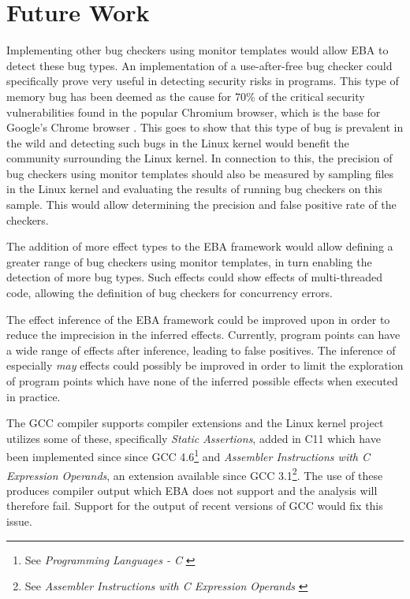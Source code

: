 \section{Future Work}

Implementing other bug checkers using monitor templates would allow EBA to detect these bug types. An implementation of a use-after-free bug checker could specifically prove very useful in detecting security risks in programs. This type of memory bug has been deemed as the cause for 70\% of the critical security vulnerabilities found in the popular Chromium browser, which is the base for Google's Chrome browser \cite{google-use-after-free}. This goes to show that this type of bug is prevalent in the wild and detecting such bugs in the Linux kernel would benefit the community surrounding the Linux kernel. In connection to this, the precision of bug checkers using monitor templates should also be measured by sampling files in the Linux kernel and evaluating the results of running bug checkers on this sample. This would allow determining the precision and false positive rate of the checkers.  

\newpar The addition of more effect types to the EBA framework would allow defining a greater range of bug checkers using monitor templates, in turn enabling the detection of more bug types. Such effects could show effects of multi-threaded code, allowing the definition of bug checkers for concurrency errors. 

\newpar The effect inference of the EBA framework could be improved upon in order to reduce the imprecision in the inferred effects. Currently, program points can have a wide range of effects after inference, leading to false positives. The inference of especially \textit{may} effects could possibly be improved in order to limit the exploration of program points which have none of the inferred possible effects when executed in practice. 

\newpar The GCC compiler supports compiler extensions and the Linux kernel project utilizes some of these, specifically \textit{Static Assertions}, added in C11 which have been implemented since since GCC 4.6\footnote{See \textit{Programming Languages - C} \cite{ISO:2011:IIIb}} and \textit{Assembler Instructions with C Expression Operands}, an extension available since GCC 3.1\footnote{See \textit{Assembler Instructions with C Expression Operands} \cite{GCC:3.1}}. The use of these produces compiler output which EBA does not support and the analysis will therefore fail. Support for the output of recent versions of GCC would fix this issue. 

